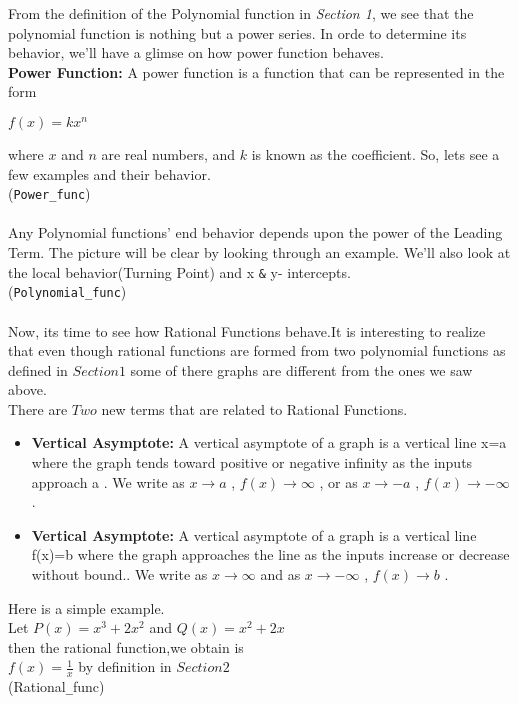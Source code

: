 \documentclass[12pt,a4paper]{article}
\begin{document}
 From the definition of the Polynomial function in \textit{Section 1}, we see that the polynomial function is nothing but a power series. In orde to determine its behavior, we'll have a glimse on how power function behaves.\\
 \textbf{Power Function:} A power function is a function that can be represented in the form
 \begin{center}
 $f(x)=kx^n$
 \end{center}
 where  $x$  and  $n$  are real numbers, and  $k$  is known as the coefficient.
So, lets see a few examples and their behavior.\\
(\verb|Power_func|)\\\\
Any Polynomial functions' end behavior depends upon the power of the Leading Term. The picture will be clear by looking through an example. We'll also look at the local behavior(Turning Point) and x \verb|&| y- intercepts.\\
(\verb|Polynomial_func|)\\\\
Now, its time to see how Rational Functions behave.It is interesting to realize that even though rational functions are formed from two polynomial functions as defined in $Section 1$ some of there graphs are different from the ones we saw above.\\
There are $Two$ new terms that are related to Rational Functions.
\begin{itemize}
	\item \textbf{Vertical Asymptote:} A vertical asymptote of a graph is a vertical line  x=a  where the graph tends toward positive or negative infinity as the inputs approach  a . We write as  $x \to a$ ,  $f(x) \to \infty$ , or as  $x \to -a$ ,  $f(x) \to -\infty$ .
	\item \textbf{Vertical Asymptote:} A vertical asymptote of a graph is a vertical line  f(x)=b  where the graph approaches the line as the inputs increase or decrease without bound.. We write as  $x \to \infty$ and as  $x \to -\infty$ ,  $f(x) \to b$ .
\end{itemize} 
Here is a simple example.\\
Let $P(x)=x^3+2x^2$ and $Q(x)=x^2+2x$\\
then the rational function,we obtain is\\
$f(x)=\frac{1}{x}$ \hspace{3cm} by definition in $Section 2$\\
(Rational\verb|_|func)
\end{document}
